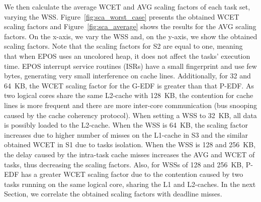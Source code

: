 \documentclass[10pt, conference, compsocconf]{IEEEtran}
\begin{document}
We then calculate the average WCET and AVG scaling factors of each task set, varying the WSS. Figure~\ref{fig:sca_worst_case} presents the obtained WCET scaling factors and Figure~\ref{fig:sca_average} shows the results for the AVG scaling factors. On the x-axis, we vary the WSS and, on the y-axis, we show the obtained scaling factors. Note that the scaling factors for S2 are equal to one, meaning that when EPOS uses an uncolored heap, it does not affect the tasks' execution time. EPOS interrupt service routines (ISRs) have a small fingerprint and use few bytes, generating very small interference on cache lines. Additionally, for 32 and 64~KB, the WCET scaling factor for the G-EDF is greater than that P-EDF. As two logical cores share the same L2-cache with 128~KB, the contention for cache lines is more frequent and there are more inter-core communication (bus snooping caused by the cache coherency protocol). When setting a WSS to 32~KB, all data is possibly loaded to the L2-cache. When the WSS is 64~KB, the scaling factor increases due to higher number of misses on the L1-cache in S3 and the similar obtained WCET in S1 due to tasks isolation. When the WSS is 128 and 256~KB, the delay caused by the intra-task cache misses increases the AVG and WCET of tasks, thus decreasing the scaling factors. Also, for WSSs of 128 and 256~KB, P-EDF has a greater WCET scaling factor due to the contention caused by two tasks running on the same logical core, sharing the L1 and L2-caches. In the next Section, we correlate the obtained scaling factors with deadline misses.
\end{document}
